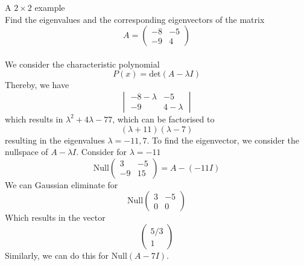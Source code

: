 \documentclass[journal, letterpaper]{IEEEtran}
\begin{document}
    \begin{myboxg}{A $2 \times 2$ example} \\ 
        Find the eigenvalues and the corresponding eigenvectors of the matrix
        $$ A = \begin{pmatrix}
            -8 & -5 \\ -9 & 4
        \end{pmatrix}$$
        \newline \\ 
        We consider the characteristic polynomial $$ P(x) = \text{det}(A - \lambda I)$$
        Thereby, we have
        $$\begin{vmatrix}
            -8 - \lambda & -5 \\ -9 & 4 - \lambda
        \end{vmatrix} $$
        which results in $ \lambda^2 + 4\lambda - 77$, which can be factorised to
        $$ (\lambda + 11)(\lambda - 7)$$
        resulting in the eigenvalues $\lambda = -11, 7$. To find the eigenvector, we consider the nullspace of $A - \lambda I$. Consider for $\lambda = -11$
        $$\text{Null}\begin{pmatrix}
            3 & -5 \\ -9 & 15
        \end{pmatrix}  = A -  (-11I)$$
        We can Gaussian eliminate for
        $$\text{Null}
        \begin{pmatrix}
            3 & -5 \\ 0 & 0
        \end{pmatrix}
        $$
        Which results in the vector
        $$
        \begin{pmatrix}
            5/3 \\ 1
        \end{pmatrix}
        $$
        Similarly, we can do this for $\text{Null}(A - 7I)$.
    \end{myboxg}
\end{document}
